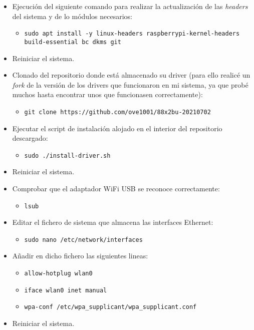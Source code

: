     \begin{itemize}
        \item Ejecución del siguiente comando para realizar la actualización de las \textit{headers} del sistema y de lo módulos necesarios:
            \begin{itemize}
                \item \texttt{sudo apt install -y linux-headers raspberrypi-kernel-headers build-essential bc dkms git}
            \end{itemize}
        \item Reiniciar el sistema.
        \item Clonado del repositorio donde está almacenado su driver (para ello realicé un \textit{fork} de la versión de los drivers que funcionaron en mi sistema, ya que probé muchos hasta encontrar unos que funcionasen correctamente):
            \begin{itemize}
                \item \texttt{git clone https://github.com/ove1001/88x2bu-20210702}
            \end{itemize}
        \item Ejecutar el script de instalación alojado en el interior del repositorio descargado:
            \begin{itemize}
                \item \texttt{sudo ./install-driver.sh}
            \end{itemize}
        \item Reiniciar el sistema.
        \item Comprobar que el adaptador WiFi USB se reconoce correctamente:
            \begin{itemize}
                \item \texttt{lsub}
            \end{itemize}
        \item Editar el fichero de sistema que almacena las interfaces Ethernet: 
            \begin{itemize}
                \item \texttt{sudo nano /etc/network/interfaces}
            \end{itemize}
        \item Añadir en dicho fichero las siguientes lineas:
            \begin{itemize}
                \item \texttt{allow-hotplug wlan0}
                \item \texttt{iface wlan0 inet manual}
                \item \texttt{wpa-conf /etc/wpa\_supplicant/wpa\_supplicant.conf}
            \end{itemize}
        \item Reiniciar el sistema.
    \end{itemize}
